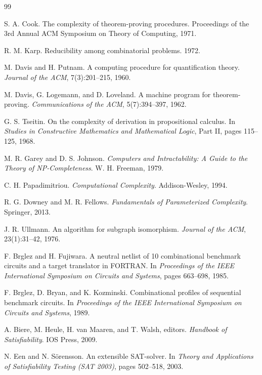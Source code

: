 \documentclass[a4paper,12pt]{article}
\theoremstyle{definition}
\begin{document}

\begin{thebibliography}{99}

   S. A. Cook. The complexity of theorem-proving procedures. Proceedings of the 3rd Annual ACM Symposium on Theory of Computing, 1971.

   R. M. Karp. Reducibility among combinatorial problems. 1972.

  M. Davis and H. Putnam. A computing procedure for quantification theory.
  \emph{Journal of the ACM}, 7(3):201--215, 1960.

  M. Davis, G. Logemann, and D. Loveland. A machine program for theorem-proving.
  \emph{Communications of the ACM}, 5(7):394--397, 1962.

  G. S. Tseitin. On the complexity of derivation in propositional calculus.
  In \emph{Studies in Constructive Mathematics and Mathematical Logic},
  Part II, pages 115--125, 1968.

  M. R. Garey and D. S. Johnson.
  \emph{Computers and Intractability: A Guide to the Theory of NP-Completeness}.
  W. H. Freeman, 1979.

  C. H. Papadimitriou.
  \emph{Computational Complexity}. Addison-Wesley, 1994.

  R. G. Downey and M. R. Fellows.
  \emph{Fundamentals of Parameterized Complexity}. Springer, 2013.

  J. R. Ullmann. An algorithm for subgraph isomorphism.
  \emph{Journal of the ACM}, 23(1):31--42, 1976.

  F. Brglez and H. Fujiwara. A neutral netlist of 10 combinational benchmark
  circuits and a target translator in FORTRAN.
  In \emph{Proceedings of the IEEE International Symposium on Circuits and
  Systems}, pages 663--698, 1985.

  F. Brglez, D. Bryan, and K. Kozminski. Combinational profiles of sequential
  benchmark circuits. In \emph{Proceedings of the IEEE International Symposium
  on Circuits and Systems}, 1989.

  A. Biere, M. Heule, H. van Maaren, and T. Walsh, editors.
  \emph{Handbook of Satisfiability}. IOS Press, 2009.

  N. Een and N. Sörensson. An extensible SAT-solver.
  In \emph{Theory and Applications of Satisfiability Testing (SAT 2003)},
  pages 502--518, 2003.


\end{thebibliography}
\end{document}

